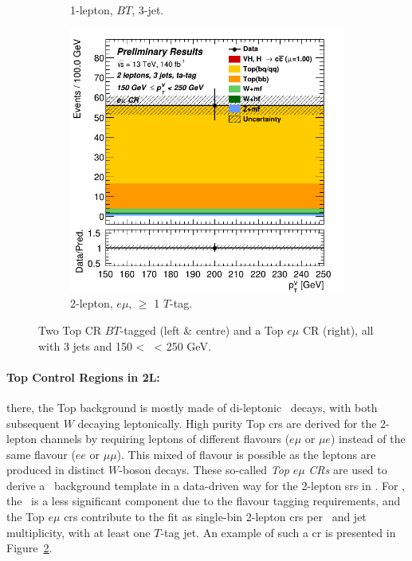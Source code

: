 \begin{figure}[h!]
\begin{subfigure}[b]{0.32\textwidth}
      \caption{1-lepton, $BT$, 3-jet.}
      \label{fig:plots_VHcc_ex_1L_TopCR}
  \end{subfigure}
  \begin{subfigure}[b]{0.32\textwidth}
    \centering
    \includegraphics[width=\textwidth]{Images/VH/Own_fit/prefit_VHcc/Region_distpTV_BMax250_BMin150_Dtopemucr_J3_TTypeta_T2_L2_Y6051_Prefit.png}
    \caption{2-lepton, $e\mu$, $\geq$ 1 $T$-tag.}
    \label{fig:plots_VHcc_ex_2L_TopCR}
\end{subfigure}
  \caption{Two Top CR $BT$-tagged (left \& centre) and a Top $e\mu$ CR (right), all with 3 jets and 150 < \ptv\ < 250 GeV.}
  \label{fig:plots_VHcc_ex_TopCR}
\end{figure} 

\paragraph{Top Control Regions in 2L:} there, the Top background is mostly made of di-leptonic \ttb\ decays, with both subsequent $W$ decaying leptonically. High purity Top \gls{cr}s are derived for the 2-lepton channels by requiring leptons of different flavours ($e\mu$ or $\mu e$) instead of the same flavour ($ee$ or $\mu\mu$). This mixed of flavour is possible as the leptons are produced in distinct $W$-boson decays. These so-called \textit{Top} $e\mu$ \textit{CRs} are used to derive a \ttb\ background template in a data-driven way for the 2-lepton \gls{sr}s in \vhb. For \vhc, the \ttb\ is a less significant component due to the flavour tagging requirements, and the Top $e\mu$ \gls{cr}s contribute to the fit as single-bin 2-lepton \gls{cr}s per \ptv\ and jet multiplicity, with at least one $T$-tag jet. An example of such a \gls{cr} is presented in Figure~\ref{fig:plots_VHcc_ex_2L_TopCR}.

